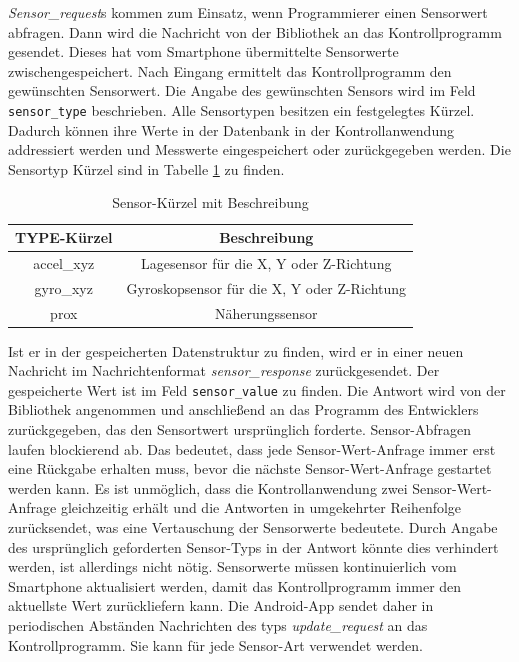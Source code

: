 \documentclass[11pt,a4paper]{report}
\begin{document}
\textit{Sensor\_request}s kommen zum Einsatz, wenn Programmierer einen Sensorwert abfragen.
Dann wird die Nachricht von der Bibliothek an das Kontrollprogramm gesendet.
Dieses hat vom Smartphone übermittelte Sensorwerte zwischengespeichert.
Nach Eingang ermittelt das Kontrollprogramm den gewünschten Sensorwert.
Die Angabe des gewünschten Sensors wird im Feld \texttt{sensor\_type} beschrieben.
Alle Sensortypen besitzen ein festgelegtes Kürzel.
Dadurch können ihre Werte in der Datenbank in der Kontrollanwendung addressiert werden und Messwerte eingespeichert oder zurückgegeben werden.
Die Sensortyp Kürzel sind in Tabelle \ref{tab:sensor_types} zu finden. 
\begin{table}[htbp]
  \centering
  \begin{tabular}{|c|c|}
      \hline
      \textbf{TYPE-Kürzel} & \textbf{Beschreibung} \\
      \hline
      accel\_xyz & Lagesensor für die X, Y oder Z-Richtung \\
      \hline
       gyro\_xyz & Gyroskopsensor für die X, Y oder Z-Richtung \\
      \hline
      prox & Näherungssensor \\
      \hline
  \end{tabular}
  \caption{Sensor-Kürzel mit Beschreibung}
  \label{tab:sensor_types}
\end{table}
Ist er in der gespeicherten Datenstruktur zu finden, wird er in einer neuen Nachricht im Nachrichtenformat \textit{sensor\_response} zurückgesendet.
Der gespeicherte Wert ist im Feld \texttt{sensor\_value} zu finden.
Die Antwort wird von der Bibliothek angenommen und anschließend an das Programm des Entwicklers zurückgegeben, das den Sensortwert ursprünglich forderte.
Sensor-Abfragen laufen blockierend ab.
Das bedeutet, dass jede Sensor-Wert-Anfrage immer erst eine Rückgabe erhalten muss, bevor die nächste Sensor-Wert-Anfrage gestartet werden kann.
Es ist unmöglich, dass die Kontrollanwendung zwei Sensor-Wert-Anfrage gleichzeitig erhält und die Antworten in umgekehrter Reihenfolge zurücksendet, was eine Vertauschung der Sensorwerte bedeutete.
Durch  Angabe des ursprünglich geforderten Sensor-Typs in der Antwort könnte dies verhindert werden, ist allerdings nicht nötig.
Sensorwerte müssen kontinuierlich vom Smartphone aktualisiert werden, damit das Kontrollprogramm immer den aktuellste Wert zurückliefern kann.
Die Android-App sendet daher in periodischen Abständen Nachrichten des typs \textit{update\_request} an das Kontrollprogramm.
Sie kann für jede Sensor-Art verwendet werden.
\end{document}
